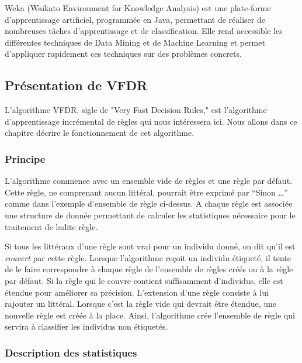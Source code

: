         Weka (Waikato Environment for Knowledge Analysis) est une plate-forme d'apprentissage artificiel, programmée en Java, permettant de réaliser de nombreuses tâches d’apprentissage et de classification. Elle rend accessible les différentes techniques de Data Mining et de Machine Learning et  permet d’appliquer rapidement ces techniques sur des problèmes concrets.

    \subsection{Présentation de VFDR}

        L’algorithme VFDR, sigle de "Very Fast Decision Rules," est l’algorithme d’apprentissage incrémental de règles qui nous intéressera ici. Nous allons dans ce chapitre décrire le fonctionnement de cet algorithme.

        \subsubsection{Principe}

            L’algorithme commence avec un ensemble vide de règles et une règle par défaut. Cette règle, ne comprenant aucun littéral, pourrait être exprimé par “Sinon …” comme dans l’exemple d’ensemble de règle ci-dessus. A chaque règle est associée une structure de donnée permettant de calculer les statistiques nécessaire pour le traitement de ladite règle.

            Si tous les littéraux d’une règle sont vrai pour un individu donné, on dit qu’il est \emph{couvert} par cette règle. Lorsque l’algorithme reçoit un individu étiqueté, il tente de le faire correspondre à chaque règle de l’ensemble de règles créés ou à la règle par défaut. Si la règle qui le couvre contient suffisamment d’individus, elle est étendue pour améliorer sa précision. L’extension d’une règle consiste à lui rajouter un littéral. Lorsque c’est la règle vide qui devrait être étendue, une nouvelle règle est créée à la place. Ainsi, l’algorithme crée l’ensemble de règle qui servira à classifier les individus non étiquetés.

        \subsubsection{Description des statistiques}

